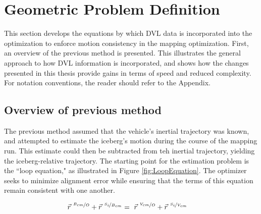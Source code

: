 %


\section{Geometric Problem Definition}

This section develops the equations by which DVL data is incorporated into the optimization to enforce motion consistency in the mapping optimization. First, an overview of the previous method is presented. This illustrates the general approach to how DVL information is incorporated, and shows how the changes presented in this thesis provide gains in terms of speed and reduced complexity. For notation conventions, the reader should refer to the Appendix.

\subsection{Overview of previous method}
The previous method assumed that the vehicle's inertial trajectory was known, and attempted to estimate the iceberg's motion during the course of the mapping run. This estimate could then be subtracted from teh inertial trajectory, yielding the iceberg-relative trajectory. The starting point for the estimation problem is the ``loop equation," as illustrated in Figure \ref{fig:LoopEquation}. The optimizer seeks to minimize alignment error while ensuring that the terms of this equation remain consistent with one another. 

\begin{align}
\vec{r}^{~\nicefrac{B_{cm}}{O}} + \vec{r}^{~\nicefrac{S_i}{B_{cm}}} &= ~\vec{r}^{~\nicefrac{V_{cm}}{O}} + \vec{r}^{~\nicefrac{S_i}{V_{cm}}}
\label{eqn:BasicLoop}
\end{align}

